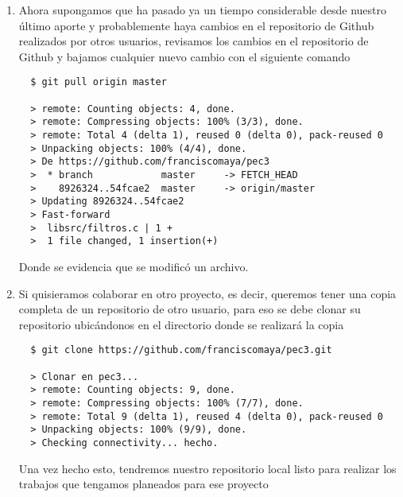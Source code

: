 \documentclass{article}
\begin{document}
\begin{enumerate}
  \item Ahora supongamos que ha pasado ya un tiempo considerable desde nuestro último aporte y probablemente haya cambios en el repositorio de Github realizados por otros usuarios, revisamos los cambios en el repositorio de Github y bajamos cualquier nuevo cambio con el siguiente comando
  \begin{lstlisting}
  $ git pull origin master

  > remote: Counting objects: 4, done.
  > remote: Compressing objects: 100% (3/3), done.
  > remote: Total 4 (delta 1), reused 0 (delta 0), pack-reused 0
  > Unpacking objects: 100% (4/4), done.
  > De https://github.com/franciscomaya/pec3
  >  * branch            master     -> FETCH_HEAD
  >    8926324..54fcae2  master     -> origin/master
  > Updating 8926324..54fcae2
  > Fast-forward
  >  libsrc/filtros.c | 1 +
  >  1 file changed, 1 insertion(+)
  \end{lstlisting}
  Donde se evidencia que se modificó un archivo.

  \item Si quisieramos colaborar en otro proyecto, es decir, queremos tener una copia completa de un repositorio de otro usuario, para eso se debe clonar su repositorio ubicándonos en el directorio donde se realizará la copia
  \begin{lstlisting}
  $ git clone https://github.com/franciscomaya/pec3.git

  > Clonar en pec3...
  > remote: Counting objects: 9, done.
  > remote: Compressing objects: 100% (7/7), done.
  > remote: Total 9 (delta 1), reused 4 (delta 0), pack-reused 0
  > Unpacking objects: 100% (9/9), done.
  > Checking connectivity... hecho.
  \end{lstlisting}
  Una vez hecho esto, tendremos nuestro repositorio local listo para realizar los trabajos que tengamos planeados para ese proyecto

  \end{enumerate}
  \newpage
\end{document}
